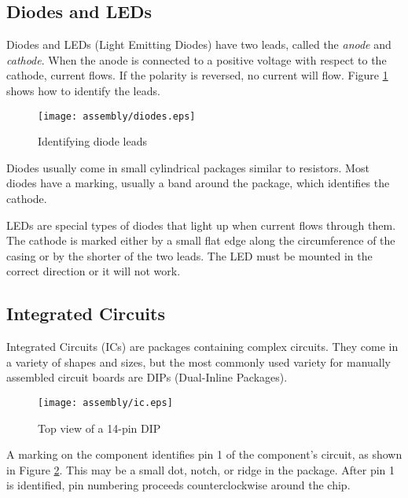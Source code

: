 \subsection{Diodes and LEDs}

Diodes and LEDs (Light Emitting Diodes) have two leads, called the
{\it anode} and {\it cathode}. When the anode is connected to a
positive voltage with respect to the cathode, current flows. If the
polarity is reversed, no current will flow. Figure \ref{diodes} shows
how to identify the leads.

\begin{figure}[htbp]
\begin{center}
\texttt{[image: assembly/diodes.eps]}
\caption{Identifying diode leads}
\label{diodes}
\end{center}
\end{figure}

Diodes usually come in small cylindrical packages similar to
resistors. Most diodes have a marking, usually a band around the
package, which identifies the cathode.

LEDs are special types of diodes that light up when current flows
through them. The cathode is marked either by a small flat edge along
the circumference of the casing or by the shorter of the two
leads. The LED must be mounted in the correct direction or it will not
work.

\subsection{Integrated Circuits}

Integrated Circuits (ICs) are packages containing complex
circuits. They come in a variety of shapes and sizes, but the most
commonly used variety for manually assembled circuit boards are DIPs
(Dual-Inline Packages).

\begin{figure}[htbp]
\begin{center}
\texttt{[image: assembly/ic.eps]}
\caption{Top view of a 14-pin DIP}
\label{ic}
\end{center}
\end{figure}

A marking on the component identifies pin 1 of the component's
circuit, as shown in Figure \ref{ic}. This may be a small dot, notch,
or ridge in the package. After pin 1 is identified, pin numbering
proceeds counterclockwise around the chip.

